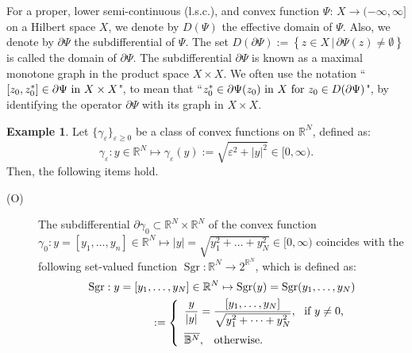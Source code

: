\documentclass{sinst}
\numberwithin{equation}{section}
\theoremstyle{plain}
\theoremstyle{definition}
\newtheorem{ex}{Example}
\def\R{\mathbb{R}}
\def\ds{\displaystyle}
\def\Sgn{\mathop{\mathrm{Sgr}}\nolimits}
\begin{document}
For a proper, lower semi-continuous (l.s.c.), and convex function $\Psi : \,X \longrightarrow (-\infty, \infty]$ on a Hilbert space $X$, we denote by $D(\Psi)$ the effective domain of $\Psi$. Also, we denote by $\partial \Psi$ the subdifferential of $\Psi$. The set $D(\partial \Psi) := \left\{ z \in X\,|\, \partial \Psi(z) \neq \emptyset \right\}$ is called the domain of $\partial\Psi$. The subdifferential $ \partial \Psi $ is known as a maximal monotone graph in the product space $X \times X$. We often use the notation ``$[z_0, z_0^*] \in \partial \Psi ~{\rm in}~ X \times X$", to mean that ``$z_0^* \in \partial \Psi(z_0) ~{\rm in}~ X~{\rm for}~ z_0 \in D(\partial \Psi)$", by identifying the operator $\partial \Psi$ with its graph in $X\times X$.
\medskip
\begin{ex}%
    \label{exConvex}
    Let $\{ \gamma_\varepsilon \}_{\varepsilon \geq 0}$ be a class of convex functions on $\R^N$, defined as:
    \begin{equation}
        \gamma_\varepsilon: y \in \R^N \mapsto \gamma_\varepsilon(y) := \sqrt{\varepsilon^2 + |y|^2} \in [0,\infty).
    \end{equation}
    Then, the following items hold. 
    \begin{description}
        \item[(O)]The subdifferential $ \partial \gamma_0 \subset \R^N \times \R^N $ of the convex function $ \gamma_0 : y = [y_1, \dots, y_n] \in \R^N \mapsto |y| =  \sqrt{y_1^2 + \dots +y_N^2} \in [0, \infty) $ coincides with the following set-valued function $ \Sgn: \R^N \rightarrow 2^{\mathbb{R}^N} $, which is defined as:
\begin{align}\label{Sgn^d}
\Sgn :  y = [y_1, & \dots, y_N] \in \mathbb{R}^N \mapsto \Sgn(y) = \Sgn(y_1, \dots, y_N) 
  \nonumber
  \\
  & := \left\{ \begin{array}{ll}
          \multicolumn{2}{l}{
                  \ds \frac{y}{|y|} = \frac{[y_1, \dots, y_N]}{\sqrt{y_1^2 +\cdots +y_N^2}}, ~ } \mbox{if $ y \ne 0 $,}
                  \\[3ex]
          \overline{\mathbb{B}^N}, & \mbox{otherwise.}
      \end{array} \right.
  \end{align}

\end{description}
\end{ex}
\end{document}
